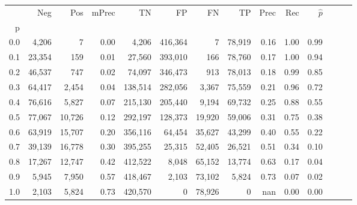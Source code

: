 \begin{tabular}{rrrrrrrrrrrrrr}
\toprule
{} &     Neg &     Pos & mPrec &       TN &       FP &      FN &      TP &  Prec &   Rec & $\hat{p}$ \\
p   &         &         &       &          &          &         &         &       &       &           \\
\midrule
0.0 &   4,206 &       7 &  0.00 &    4,206 &  416,364 &       7 &  78,919 &  0.16 &  1.00 &      0.99 \\
0.1 &  23,354 &     159 &  0.01 &   27,560 &  393,010 &     166 &  78,760 &  0.17 &  1.00 &      0.94 \\
0.2 &  46,537 &     747 &  0.02 &   74,097 &  346,473 &     913 &  78,013 &  0.18 &  0.99 &      0.85 \\
0.3 &  64,417 &   2,454 &  0.04 &  138,514 &  282,056 &   3,367 &  75,559 &  0.21 &  0.96 &      0.72 \\
0.4 &  76,616 &   5,827 &  0.07 &  215,130 &  205,440 &   9,194 &  69,732 &  0.25 &  0.88 &      0.55 \\
0.5 &  77,067 &  10,726 &  0.12 &  292,197 &  128,373 &  19,920 &  59,006 &  0.31 &  0.75 &      0.38 \\
0.6 &  63,919 &  15,707 &  0.20 &  356,116 &   64,454 &  35,627 &  43,299 &  0.40 &  0.55 &      0.22 \\
0.7 &  39,139 &  16,778 &  0.30 &  395,255 &   25,315 &  52,405 &  26,521 &  0.51 &  0.34 &      0.10 \\
0.8 &  17,267 &  12,747 &  0.42 &  412,522 &    8,048 &  65,152 &  13,774 &  0.63 &  0.17 &      0.04 \\
0.9 &   5,945 &   7,950 &  0.57 &  418,467 &    2,103 &  73,102 &   5,824 &  0.73 &  0.07 &      0.02 \\
1.0 &   2,103 &   5,824 &  0.73 &  420,570 &        0 &  78,926 &       0 &   nan &  0.00 &      0.00 \\
\bottomrule
\end{tabular}
